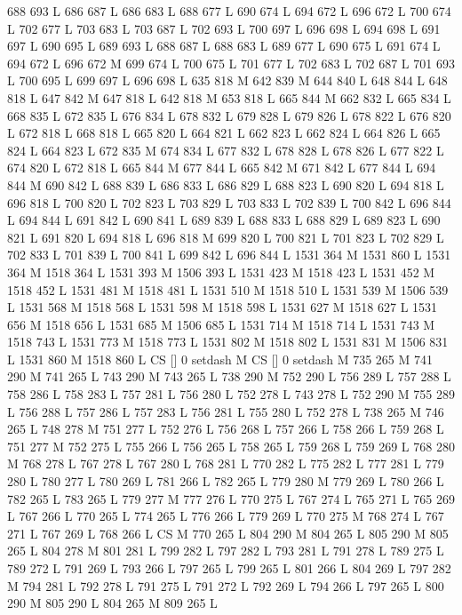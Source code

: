 {{{{{{{{{{{{{{{{{{688 693 L
686 687 L
686 683 L
688 677 L
690 674 L
694 672 L
696 672 L
700 674 L
702 677 L
703 683 L
703 687 L
702 693 L
700 697 L
696 698 L
694 698 L
691 697 L
690 695 L
689 693 L
688 687 L
688 683 L
689 677 L
690 675 L
691 674 L
694 672 L
696 672 M 699 674 L
700 675 L
701 677 L
702 683 L
702 687 L
701 693 L
700 695 L
699 697 L
696 698 L
635 818 M 642 839 M 644 840 L
648 844 L
648 818 L
647 842 M 647 818 L
642 818 M 653 818 L
665 844 M 662 832 L
665 834 L
668 835 L
672 835 L
676 834 L
678 832 L
679 828 L
679 826 L
678 822 L
676 820 L
672 818 L
668 818 L
665 820 L
664 821 L
662 823 L
662 824 L
664 826 L
665 824 L
664 823 L
672 835 M 674 834 L
677 832 L
678 828 L
678 826 L
677 822 L
674 820 L
672 818 L
665 844 M 677 844 L
665 842 M 671 842 L
677 844 L
694 844 M 690 842 L
688 839 L
686 833 L
686 829 L
688 823 L
690 820 L
694 818 L
696 818 L
700 820 L
702 823 L
703 829 L
703 833 L
702 839 L
700 842 L
696 844 L
694 844 L
691 842 L
690 841 L
689 839 L
688 833 L
688 829 L
689 823 L
690 821 L
691 820 L
694 818 L
696 818 M 699 820 L
700 821 L
701 823 L
702 829 L
702 833 L
701 839 L
700 841 L
699 842 L
696 844 L
1531 364 M 1531 860 L
1531 364 M 1518 364 L
1531 393 M 1506 393 L
1531 423 M 1518 423 L
1531 452 M 1518 452 L
1531 481 M 1518 481 L
1531 510 M 1518 510 L
1531 539 M 1506 539 L
1531 568 M 1518 568 L
1531 598 M 1518 598 L
1531 627 M 1518 627 L
1531 656 M 1518 656 L
1531 685 M 1506 685 L
1531 714 M 1518 714 L
1531 743 M 1518 743 L
1531 773 M 1518 773 L
1531 802 M 1518 802 L
1531 831 M 1506 831 L
1531 860 M 1518 860 L
CS [] 0 setdash M
CS [] 0 setdash M
735 265 M 741 290 M 741 265 L
743 290 M 743 265 L
738 290 M 752 290 L
756 289 L
757 288 L
758 286 L
758 283 L
757 281 L
756 280 L
752 278 L
743 278 L
752 290 M 755 289 L
756 288 L
757 286 L
757 283 L
756 281 L
755 280 L
752 278 L
738 265 M 746 265 L
748 278 M 751 277 L
752 276 L
756 268 L
757 266 L
758 266 L
759 268 L
751 277 M 752 275 L
755 266 L
756 265 L
758 265 L
759 268 L
759 269 L
768 280 M 768 278 L
767 278 L
767 280 L
768 281 L
770 282 L
775 282 L
777 281 L
779 280 L
780 277 L
780 269 L
781 266 L
782 265 L
779 280 M 779 269 L
780 266 L
782 265 L
783 265 L
779 277 M 777 276 L
770 275 L
767 274 L
765 271 L
765 269 L
767 266 L
770 265 L
774 265 L
776 266 L
779 269 L
770 275 M 768 274 L
767 271 L
767 269 L
768 266 L
CS M
770 265 L
804 290 M 804 265 L
805 290 M 805 265 L
804 278 M 801 281 L
799 282 L
797 282 L
793 281 L
791 278 L
789 275 L
789 272 L
791 269 L
793 266 L
797 265 L
799 265 L
801 266 L
804 269 L
797 282 M 794 281 L
792 278 L
791 275 L
791 272 L
792 269 L
794 266 L
797 265 L
800 290 M 805 290 L
804 265 M 809 265 L
}}}}}}}}}}}}}}}}}}
